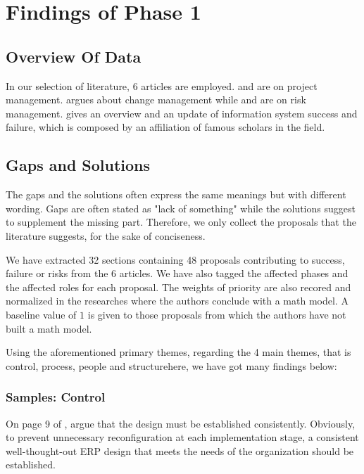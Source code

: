 
\section{Findings of Phase 1}

\subsection{Overview Of Data}
In our selection of literature, 6 articles are employed.  and  are on project management.  argues about change management while  and  are on risk management.  gives an overview and an update of information system success and failure, which is composed by an affiliation of famous scholars in the field.

\subsection{Gaps and Solutions}

The gaps and the solutions often express the same meanings but with different wording. Gaps are often stated as "lack of something" while the solutions suggest to supplement the missing part. Therefore, we only collect the proposals that the literature suggests, for the sake of conciseness.

We have extracted 32 sections containing 48 proposals contributing to success, failure or risks from the 6 articles. We have also tagged the affected phases and the affected roles for each proposal. The weights of priority are also recored and normalized in the researches where the authors conclude with a math model. A baseline value of $1$ is given to those proposals from which the authors have not built a math model.

Using the aforementioned primary themes, regarding the 4 main themes, that is control, process, people and structurehere, we have got many findings below:

\subsubsection{Samples: Control}

On page 9 of , \citeauthor{3} argue that the design must be established consistently. Obviously, to prevent unnecessary reconfiguration at each implementation stage, a consistent well-thought-out ERP design that meets the needs of the organization should be established.


